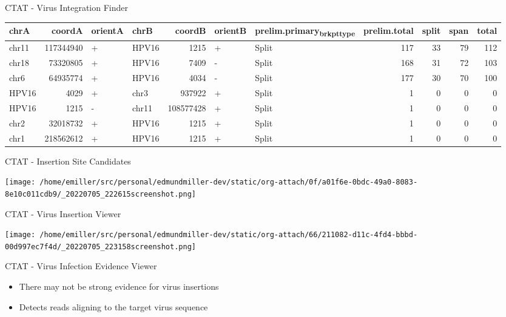 \documentclass[bigger]{beamer}
\begin{document}
\begin{frame}[label={sec:org441dc54}]{CTAT - Virus Integration Finder}
\footnotesize
\begin{center}
\begin{tabular}{lrllrllrrrr}
chrA & coordA & orientA & chrB & coordB & orientB & prelim.primary\textsubscript{brkpt}\textsubscript{type} & prelim.total & split & span & total\\
\hline
chr11 & 117344940 & + & HPV16 & 1215 & + & Split & 117 & 33 & 79 & 112\\
chr18 & 73320805 & + & HPV16 & 7409 & - & Split & 168 & 31 & 72 & 103\\
chr6 & 64935774 & + & HPV16 & 4034 & - & Split & 177 & 30 & 70 & 100\\
HPV16 & 4029 & + & chr3 & 937922 & + & Split & 1 & 0 & 0 & 0\\
HPV16 & 1215 & - & chr11 & 108577428 & + & Split & 1 & 0 & 0 & 0\\
chr2 & 32018732 & + & HPV16 & 1215 & + & Split & 1 & 0 & 0 & 0\\
chr1 & 218562612 & + & HPV16 & 1215 & + & Split & 1 & 0 & 0 & 0\\
\end{tabular}
\end{center}
\end{frame}


\begin{frame}[label={sec:orgdfacaee}]{CTAT - Insertion Site Candidates}
\begin{center}
\texttt{[image: /home/emiller/src/personal/edmundmiller-dev/static/org-attach/0f/a01f6e-0bdc-49a0-8083-8e10c011cdb9/\_20220705\_222615screenshot.png]}
\end{center}
\end{frame}


\begin{frame}[label={sec:org43a602b}]{CTAT - Virus Insertion Viewer}
\begin{center}
\texttt{[image: /home/emiller/src/personal/edmundmiller-dev/static/org-attach/66/211082-d11c-4fd4-bbbd-00d997ec7f4d/\_20220705\_223158screenshot.png]}
\end{center}
\end{frame}

\begin{frame}[label={sec:org288f65d}]{CTAT - Virus Infection Evidence Viewer}
\begin{itemize}
\item There may not be strong evidence for virus insertions
\item Detects reads aligning to the target virus sequence
\end{itemize}
\end{frame}
\end{document}
